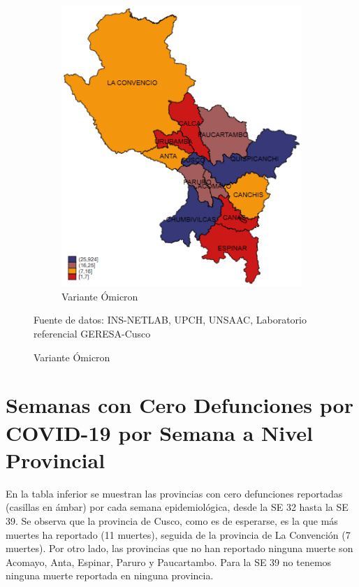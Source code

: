 \documentclass[12pt,a4paper,openany]{book}
\begin{document}
\begin{figure}[h]
\begin{subfigure}[b]{0.40\textwidth}
			\includegraphics[width=\textwidth]{../figuras/variantes_provincial_omicron.png}
			\caption{Variante Ómicron}
		\end{subfigure}
	{\footnotesize {Fuente de datos: INS-NETLAB, UPCH, UNSAAC, Laboratorio referencial GERESA-Cusco}}
	\end{figure}
	
	\clearpage
	
	
	
	\clearpage
	\section*{Semanas con Cero Defunciones por COVID-19 por Semana a Nivel Provincial}
	
	\noindent En la tabla inferior se muestran las provincias con cero defunciones reportadas (casillas en ámbar) por cada semana epidemiológica, desde la SE 32 hasta la SE 39. Se observa que la provincia de Cusco, como es de esperarse, es la que más muertes ha reportado (11 muertes), seguida de la provincia de La Convención (7 muertes). Por otro lado, las provincias que no han reportado ninguna muerte son Acomayo, Anta, Espinar, Paruro y Paucartambo. Para la SE 39 no tenemos ninguna muerte reportada en ninguna provincia.
	
\end{document}
